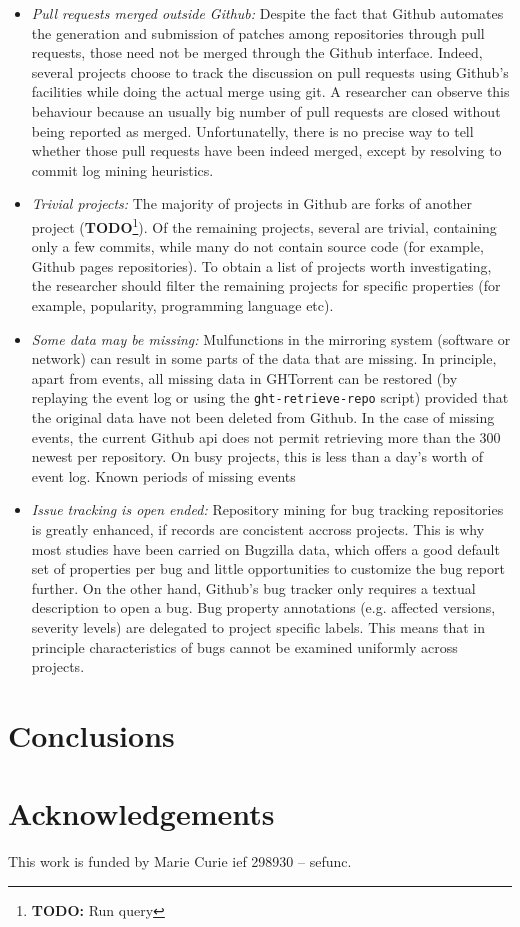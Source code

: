 \documentclass[conference]{IEEEtran}
\newcommand{\todo}[1]{\textbf{TODO}\footnote{\textbf{TODO:} #1}}
\begin{document}
\begin{itemize}
  \item \emph{Pull requests merged outside Github:} Despite the fact that Github
    automates the generation and submission of patches among repositories
    through pull requests, those need not be merged through the Github
    interface. Indeed, several projects choose to track the discussion on pull
    requests using Github's facilities while doing the actual merge using
    {\sf git}. A researcher can observe this behaviour because an usually big
    number of pull requests are closed without being reported as merged.
    Unfortunatelly, there is no precise way to tell whether those pull requests
    have been indeed merged, except by resolving to commit log mining
    heuristics.

  \item \emph{Trivial projects:} The majority of projects in Github are forks of
    another project (\todo{Run query}). Of the remaining projects, several are
    trivial, containing only a few commits, while many do not contain source
    code (for example, Github pages repositories). To obtain a list of projects
    worth investigating, the researcher should filter the remaining projects
    for specific properties (for example, popularity, programming language etc).

  \item \emph{Some data may be missing:} 
    Mulfunctions in the mirroring system (software or network) can result in 
    some parts of the data that are missing. In principle, apart from
    events, all missing data in GHTorrent can be restored (by replaying the
    event log or using the \texttt{ght-retrieve-repo} script) provided that the
    original data have not been deleted from Github. In the case of missing
    events, the current Github {\sc api} does not permit retrieving more than
    the 300 newest per repository. On busy projects, this is less than
    a day's worth of event log. Known periods of missing events 

  \item \emph{Issue tracking is open ended:} Repository mining for bug tracking
    repositories is greatly enhanced, if records are concistent accross
    projects. This is why most studies have been carried on Bugzilla data, which
    offers a good default set of properties per bug and little opportunities to
    customize the bug report further. On the other hand, Github's bug tracker
    only requires a textual description to open a bug. Bug property annotations
    (e.g. affected versions, severity levels) are delegated to project specific
    labels. This means that in principle characteristics of bugs cannot be
    examined uniformly across projects.

\end{itemize}


\section{Conclusions}

\section*{Acknowledgements}
This work is funded by Marie Curie {\sc ief} 298930 -- {\sc sefunc}.



\end{document}
